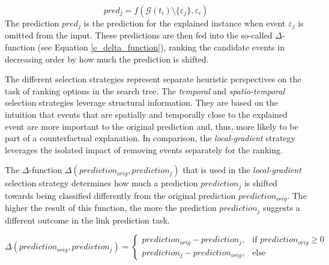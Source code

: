 \begin{itemize}
    \begin{equation}
        pred_j = f(\mathcal{G}(t_i) \setminus \{\varepsilon_j\}, \varepsilon_i)
    \end{equation}
    The prediction $pred_j$ is the prediction for the explained instance when event $\varepsilon_j$ is omitted from the input. These predictions are then fed into the so-called $\Delta$-function (see Equation \ref{e_delta_function}), ranking the candidate events in decreasing order by how much the prediction is shifted.
    
\end{itemize}

The different selection strategies represent separate heuristic perspectives on the task of ranking options in the search tree. The \textit{temporal} and \textit{spatio-temporal} selection strategies leverage structural information. They are based on the intuition that events that are spatially and temporally close to the explained event are more important to the original prediction and, thus, more likely to be part of a counterfactual explanation. In comparison, the \textit{local-gradient} strategy leverages the isolated impact of removing events separately for the ranking.

The $\Delta$-function $\Delta(prediction_{orig}, prediction_j)$ that is used in the \textit{local-gradient} selection strategy determines how much a prediction $prediction_j$ is shifted towards being classified differently from the original prediction $prediction_{orig}$. The higher the result of this function, the more the prediction $prediction_j$ suggests a different outcome in the link prediction task.

\begin{equation}
\label{e_delta_function}
    \Delta(prediction_{orig}, prediction_j) = 
    \begin{cases}
        prediction_{orig} - prediction_j,  &\text{if } prediction_{orig} \geq 0 \\
        prediction_j - prediction_{orig},  &\text{else}
    \end{cases}
\end{equation}


